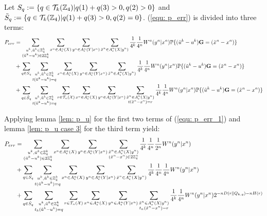 Let $S_q:=\{q\in \mathcal{T}_k(\mathbb{Z}_4) | q(1)+q(3)>0, q(2)>0 \}$ and $\tilde{S}_q:=\{q\in \mathcal{T}_k(\mathbb{Z}_4) | q(1)+q(3)>0, q(2)=0 \}$.  (\ref{equ: p_err}) is divided into three terms: 
\begin{align} \label{equ: p_err_1}\nonumber
P_{err}&=
\sum_{\substack{u^k, \tilde{u}^k \in \ZZ_4^k \\ (\tilde{u}^k-u^k)\in 2\ZZ_4^k}} \sum_{x^n\in A_\epsilon^n(X)} \sum_{y^n\in A_\epsilon^n(Y|x^n)} \sum_{\substack{\tilde{x}^n\in A_\epsilon^n(X|y^n)} } \frac{1}{4^k}\frac{1}{4^n} W^n(y^n|x^n)\PP\{ (\tilde{u}^k-u^k)\mathbf{G}=(\tilde{x}^n-x^n)\}\\\nonumber
%
&+\sum_{q\in S_q}\sum_{\substack{u^k, \tilde{u}^k \in \ZZ_4^k \\ t(\tilde{u}^k-u^k)=q}} \sum_{x^n\in A_\epsilon^n(X)} \sum_{y^n\in A_\epsilon^n(Y|x^n)} \sum_{\substack{\tilde{x}^n \in A_\epsilon^n(X|y^n)} } \frac{1}{4^k}\frac{1}{4^n}  W^n(y^n|x^n) \PP\{ (\tilde{u}^k-u^k)\mathbf{G}=(\tilde{x}^n-x^n)\}\\
%
&+\sum_{q\in \tilde{S}_q}\sum_{\substack{u^k, \tilde{u}^k \in \ZZ_4^k \\ t(\tilde{u}^k-u^k)=q}} \sum_{r\in\mathcal{T}_n(\mathcal{X}) } \sum_{x^n\in A_\epsilon^n(X)} \sum_{y^n\in A_\epsilon^n(Y|x^n)} \sum_{\substack{\tilde{x}^n\in A_\epsilon^n(X|y^n)\\t(\tilde{x}^n-x^n)=r} } \frac{1}{4^k}\frac{1}{4^n} W^n(y^n|x^n)\PP\{ (\tilde{u}^k-u^k)\mathbf{G}=(\tilde{x}^n-x^n)\}
\end{align}


Applying  lemma \ref{lem: p_u} for the first two terms of (\ref{equ: p_err_1}) and lemma \ref{lem: p_u case 3} for the third term yield: 
\begin{align}\label{p_err_part 1}
P_{err}&=
\sum_{\substack{u^k, \tilde{u}^k \in \ZZ_4^k \\ (\tilde{u}^k-u^k)\in 2\ZZ_4^k}} \sum_{x^n\in A_\epsilon^n(X)} \sum_{y^n\in A_\epsilon^n(Y|x^n)} \sum_{\substack{\tilde{x}^n\in A_\epsilon^n(X|y^n)\\(\tilde{x}^n-x^n)\in 2\ZZ_4^n} } \frac{1}{4^k}\frac{1}{4^n} \frac{1}{2^n} W^n(y^n|x^n)\\\label{p_err_part 2}
%
&+\sum_{q\in S_q}\sum_{\substack{u^k, \tilde{u}^k \in \ZZ_4^k \\ t(\tilde{u}^k-u^k)=q}} \sum_{x^n\in A_\epsilon^n(X)} \sum_{y^n\in A_\epsilon^n(Y|x^n)} \sum_{\substack{\tilde{x}^n \in A_\epsilon^n(X|y^n)} } \frac{1}{4^k}\frac{1}{4^n} \frac{1}{4^n} W^n(y^n|x^n)\\\label{p_err_part 3}
%
&+\sum_{q\in \tilde{S}_q}\sum_{\substack{u^k, \tilde{u}^k \in \ZZ_4^k \\ t_k(\tilde{u}^k-u^k)=q}} \sum_{r\in\mathcal{T}_n(\mathcal{X}) } \sum_{x^n\in A_\epsilon^n(X)} \sum_{y^n\in A_\epsilon^n(Y|x^n)} \sum_{\substack{\tilde{x}^n\in A_\epsilon^n(X|y^n)\\t_n(\tilde{x}^n-x^n)=r} } \frac{1}{4^k}\frac{1}{4^n} W^n(y^n|x^n)2^{-nD(r\| Q_{k,q})-nH(r)}
\end{align}


